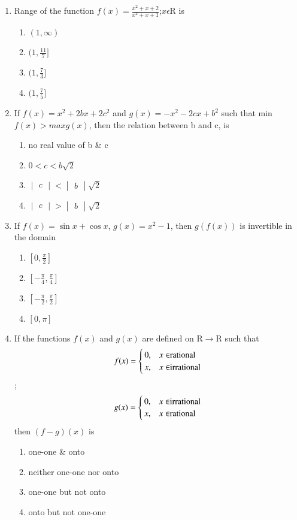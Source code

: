 \begin{enumerate}[label=\arabic*.,ref=\thesubsection.\theenumi]
\item Range of the function $f(x)=\frac{x^2+x+2}{x^2+x+1}$;$x\epsilon$R is
\begin{enumerate}
\item $(1,\infty)$
\item $(1,\frac{11}{7}]$
\item $(1,\frac{7}{3}]$
\item $(1,\frac{7}{5}]$
\end{enumerate}

\item If $f(x)=x^{2}+2bx+2c^{2}$ and $g(x)=-x^{2}-2cx+b^{2}$ such that min $f(x) > max g(x)$, then the relation between b and c, is
\begin{enumerate}
\item no real value of b \& c
\item $0<c<b\sqrt{2}$
\item $\begin{vmatrix} c \end{vmatrix} < \begin{vmatrix} b\end{vmatrix} \sqrt{2}$
\item $\begin{vmatrix} c \end{vmatrix} > \begin{vmatrix} b\end{vmatrix} \sqrt{2}$
\end{enumerate}

\item If $f(x)=\sin x+\cos x$, $g(x)=x^{2}-1$, then $g(f(x))$ is invertible in the domain
\begin{enumerate}
\item $[0,\frac{\pi}{2}]$
\item $[-\frac{\pi}{4},\frac{\pi}{4}]$
\item $[-\frac{\pi}{2},\frac{\pi}{2}]$
\item $[0,\pi]$
\end{enumerate}

\item If the functions $f(x)$ and $g(x)$ are defined on R$\rightarrow$R such that \[f(x)=\begin{cases} 
       0, & x \in $rational$\\
       x, & x \in $irrational$\\
   \end{cases}\]; \[g(x)=\begin{cases} 
       0, & x \in $irrational$\\
       x, & x \in $rational$\\
   \end{cases}\] then $(f-g)(x)$ is
\begin{enumerate}
\item one-one \& onto
\item neither one-one nor onto
\item one-one but not onto
\item onto but not one-one
\end{enumerate}


\end{enumerate}
